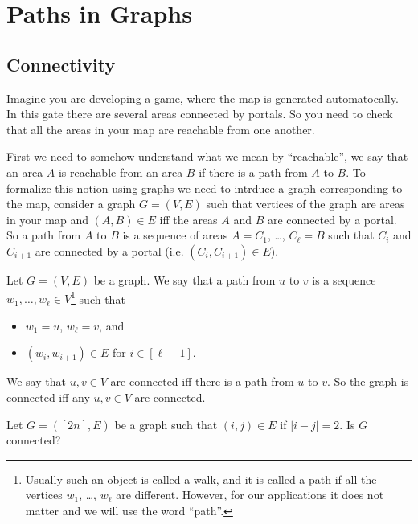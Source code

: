 \chapter{Paths in Graphs}
\label{chapter:paths}
\section{Connectivity}
Imagine you are developing a game, where the map is generated automatocally.
In this gate there are several areas connected by portals. So you need to check
that all the areas in your map are reachable from one another.

First we need to somehow understand what we mean by ``reachable'', we say that
an area $A$ is reachable from an area $B$ if there is a path from $A$ to
$B$. To formalize this notion using graphs we need to intrduce a graph
corresponding to the map, consider a graph $G = (V, E)$ such that vertices of
the graph are areas in your map and $(A, B) \in E$ iff the areas $A$ and $B$
are connected by a portal. So a path from $A$ to $B$ is a sequence of areas
$A = C_1$, \dots, $C_\ell = B$ such that $C_i$ and $C_{i + 1}$ are connected by
a portal (i.e. $(C_i, C_{i + 1}) \in E$).
\begin{definition}
  Let $G = (V, E)$ be a graph. We say that a path from $u$ to $v$ is
  a sequence $w_1, \dots, w_\ell \in V$\footnote{%
    Usually such an object is called a walk, and it is called a path if
    all the vertices $w_1$, \dots, $w_\ell$ are different. However,
    for our applications it does not matter and we will use the word ``path''.
  } such that
  \begin{itemize}
    \item $w_1 = u$, $w_\ell = v$, and
    \item $(w_i, w_{i + 1}) \in E$ for $i \in [\ell - 1]$.
  \end{itemize}

  We say that $u, v \in V$ are connected iff there is a path from $u$ to $v$.
  So the graph is connected iff any $u, v \in V$ are connected.
\end{definition}

\begin{exercise}
  Let $G = ([2n], E)$ be a graph such that $(i, j) \in E$ if $|i - j| = 2$.
  Is $G$ connected?
\end{exercise}

